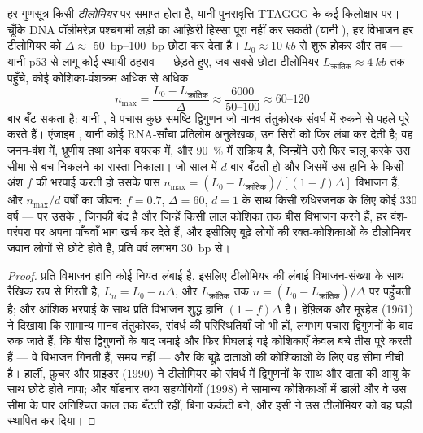 \begin{theorem}[टीलोमियर और हेफ़्लिक सीमा]\label{thm:b3:stem-cells:hayflick}
हर गुणसूत्र किसी \emph{टीलोमियर} पर समाप्त होता है, यानी पुनरावृत्ति
TTAGGG के कई किलोक्षार पर। चूँकि DNA पॉलीमरेज़ पश्चगामी लड़ी का
आख़िरी हिस्सा पूरा नहीं कर सकती (यानी \emph{}), हर
विभाजन हर टीलोमियर को $\Delta \approx$ \qtyrange{50}{100}{bp} छोटा कर
देता है। $L_{0} \approx \qty{10}{kb}$ से शुरू होकर और तब
\emph{} --- यानी p53 से लागू कोई स्थायी ठहराव --- छेड़ते
हुए, जब सबसे छोटा टीलोमियर $L_{\text{क्रांतिक}} \approx \qty{4}{kb}$ तक
पहुँचे, कोई कोशिका-वंशक्रम अधिक से अधिक
\[
n_{\max} = \frac{L_{0} - L_{\text{क्रांतिक}}}{\Delta} \approx \frac{6000}{50\text{--}100} \approx 60\text{--}120
\]
बार बँट सकता है: यानी \emph{}, वे पचास-कुछ समष्टि-द्विगुणन
जो मानव तंतुकोरक संवर्ध में रुकने से पहले पूरे करते हैं। एंज़ाइम
\emph{}, यानी कोई RNA-साँचा प्रतिलोम अनुलेखक, उन सिरों को फिर
लंबा कर देती है; वह जनन-वंश में, भ्रूणीय तथा अनेक वयस्क 
में, और \qty{90}{\%}  में सक्रिय है, जिन्होंने उसे फिर चालू करके
उस सीमा से बच निकलने का रास्ता निकाला। जो  साल में $d$ बार
बँटती हो और जिसमें  उस हानि के किसी अंश $f$ की भरपाई करती हो
उसके पास $n_{\max} = (L_{0} - L_{\text{क्रांतिक}})/[(1 - f)\Delta]$
विभाजन हैं, और $n_{\max}/d$ वर्षों का जीवन: $f = 0.7$, $\Delta
= 60$, $d = 1$ के साथ किसी रुधिरजनक  के लिए कोई 330 वर्ष ---
पर उसके , जिनकी  बंद है और जिन्हें किसी लाल कोशिका तक
बीस विभाजन करने हैं, हर वंश-परंपरा पर अपना पाँचवाँ भाग खर्च कर देते हैं,
और इसीलिए बूढ़े लोगों की रक्त-कोशिकाओं के टीलोमियर जवान लोगों से छोटे
होते हैं, प्रति वर्ष लगभग \qty{30}{bp} से।
\end{theorem}
\begin{proof}
प्रति विभाजन हानि कोई नियत लंबाई है, इसलिए टीलोमियर की लंबाई विभाजन-संख्या
के साथ रैखिक रूप से गिरती है, $L_{n} = L_{0} - n\Delta$, और
$L_{\text{क्रांतिक}}$ तक $n = (L_{0} - L_{\text{क्रांतिक}})/\Delta$ पर पहुँचती
है; और आंशिक भरपाई के साथ प्रति विभाजन शुद्ध हानि $(1 - f)\Delta$ है।
हेफ़्लिक और मूरहेड (1961) ने दिखाया कि सामान्य मानव तंतुकोरक, संवर्ध की
परिस्थितियाँ जो भी हों, लगभग पचास द्विगुणनों के बाद रुक जाते हैं, कि
बीस द्विगुणनों के बाद जमाई और फिर पिघलाई गई कोशिकाएँ केवल बचे तीस पूरे
करती हैं --- वे विभाजन गिनती हैं, समय नहीं --- और कि बूढ़े दाताओं की
कोशिकाओं के लिए वह सीमा नीची है। हार्ली, फ़ुचर और ग्राइडर (1990) ने
टीलोमियर को संवर्ध में द्विगुणनों के साथ और दाता की आयु के साथ छोटे होते
नापा; और बॉडनार तथा सहयोगियों (1998) ने सामान्य कोशिकाओं में 
डाली और वे उस सीमा के पार अनिश्चित काल तक बँटती रहीं, बिना कर्कटी बने,
और इसी ने उस टीलोमियर को वह घड़ी स्थापित कर दिया।
\end{proof}

